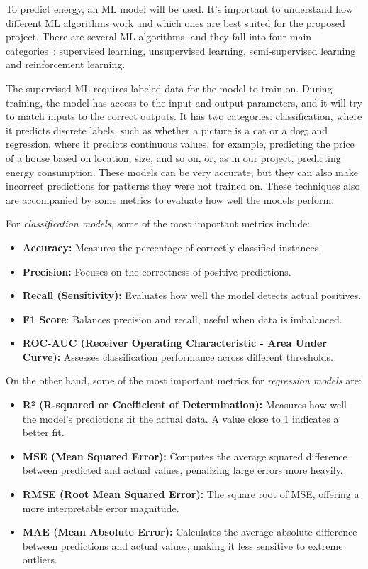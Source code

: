 To predict energy, an ML model will be used. It's important to understand how different ML algorithms work and which ones are best suited for the proposed project. There are several ML algorithms, and they fall into four main categories~\cite{sarker2021machine}: supervised learning, unsupervised learning, semi-supervised learning and reinforcement learning.

The supervised ML requires labeled data for the model to train on. During training, the model has access to the input and output parameters, and it will try to match inputs to the correct outputs. It has two categories: classification, where it predicts discrete labels, such as whether a picture is a cat or a dog; and regression, where it predicts continuous values, for example, predicting the price of a house based on location, size, and so on, or, as in our project, predicting energy consumption. These models can be very accurate, but they can also make incorrect predictions for patterns they were not trained on. These techniques also are accompanied by some metrics to evaluate how well the models perform.



For \textit{classification models}, some of the most important metrics include:
\begin{itemize}
    \item \textbf{Accuracy:} Measures the percentage of correctly classified instances.
    \item \textbf{Precision:} Focuses on the correctness of positive predictions.
    \item \textbf{Recall (Sensitivity):} Evaluates how well the model detects actual positives.
    \item \textbf{F1 Score}: Balances precision and recall, useful when data is imbalanced.
    \item \textbf{ROC-AUC (Receiver Operating Characteristic - Area Under Curve):} Assesses classification performance across different thresholds.
\end{itemize}

On the other hand, some of the most important metrics for \textit{regression models} are:
\begin{itemize}
    \item \textbf{R² (R-squared or Coefficient of Determination):} Measures how well the model's predictions fit the actual data. A value close to 1 indicates a better fit.
    \item \textbf{MSE (Mean Squared Error):} Computes the average squared difference between predicted and actual values, penalizing large errors more heavily.
    \item \textbf{RMSE (Root Mean Squared Error):} The square root of MSE, offering a more interpretable error magnitude.
    \item \textbf{MAE (Mean Absolute Error):} Calculates the average absolute difference between predictions and actual values, making it less sensitive to extreme outliers.
\end{itemize}


